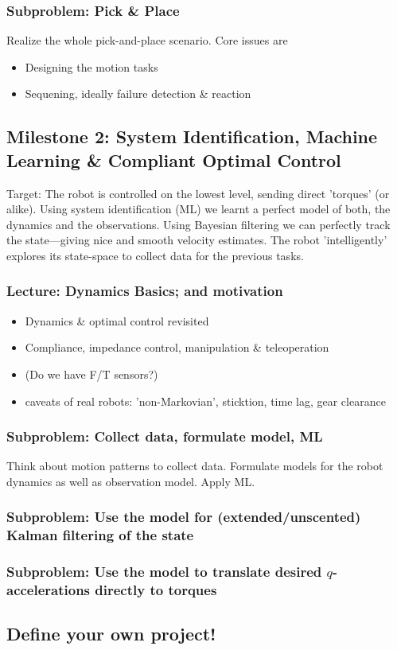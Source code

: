 \documentclass[10pt,fleqn,twoside]{article}
\begin{document}
\subsubsection{Subproblem: Pick \& Place}

Realize the whole pick-and-place scenario. Core issues are
\begin{itemize}
\item Designing the motion tasks
\item Sequening, ideally failure detection \& reaction
\end{itemize}




\subsection{Milestone 2: System Identification, Machine Learning \&
  Compliant Optimal Control}

Target: The robot is controlled on the lowest level, sending direct
'torques' (or alike). Using system identification (ML) we learnt a
perfect model of both, the dynamics and the observations. Using
Bayesian filtering we can perfectly track the state---giving nice and
smooth velocity estimates. The robot 'intelligently' explores its
state-space to collect data for the previous tasks.

\subsubsection{Lecture: Dynamics Basics; and motivation}

\begin{itemize}
\item Dynamics \& optimal control revisited
\item Compliance, impedance control, manipulation \& teleoperation
\item (Do we have F/T sensors?)
\item caveats of real robots: 'non-Markovian', sticktion, time lag,
  gear clearance
\end{itemize}

\subsubsection{Subproblem: Collect data, formulate model, ML}

Think about motion patterns to collect data. Formulate models for the
robot dynamics as well as observation model. Apply ML.

\subsubsection{Subproblem: Use the model for (extended/unscented)
  Kalman filtering of the state}


\subsubsection{Subproblem: Use the model to translate desired
  $q$-accelerations directly to torques}



\subsection{Define your own project!}
\end{document}
